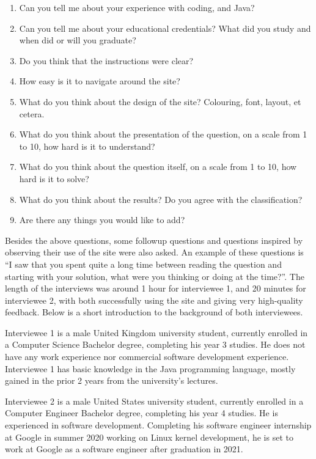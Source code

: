 \documentclass{report}
\begin{document}
\begin{enumerate}
\item Can you tell me about your experience with coding, and Java?
\item Can you tell me about your educational credentials? What did you study and when did or will you graduate?
\item Do you think that the instructions were clear?
\item How easy is it to navigate around the site?
\item What do you think about the design of the site? Colouring, font, layout, et cetera.
\item What do you think about the presentation of the question, on a scale from 1 to 10, how hard is it to understand?
\item What do you think about the question itself, on a scale from 1 to 10, how hard is it to solve?
\item What do you think about the results? Do you agree with the classification?
\item Are there any things you would like to add?
\end{enumerate}

Besides the above questions, some followup questions and questions inspired by observing their use of the site were also asked. An example of these questions is “I saw that you spent quite a long time between reading the question and starting with your solution, what were you thinking or doing at the time?”. The length of the interviews was around 1 hour for interviewee 1, and 20 minutes for interviewee 2, with both successfully using the site and giving very high-quality feedback. Below is a short introduction to the background of both interviewees.

Interviewee 1 is a male United Kingdom university student, currently enrolled in a Computer Science Bachelor degree, completing his year 3 studies. He does not have any work experience nor commercial software development experience. Interviewee 1 has basic knowledge in the Java programming language, mostly gained in the prior 2 years from the university’s lectures.

Interviewee 2 is a male United States university student, currently enrolled in a Computer Engineer Bachelor degree, completing his year 4 studies. He is experienced in software development. Completing his software engineer internship at Google in summer 2020 working on Linux kernel development, he is set to work at Google as a software engineer after graduation in 2021.
\end{document}
